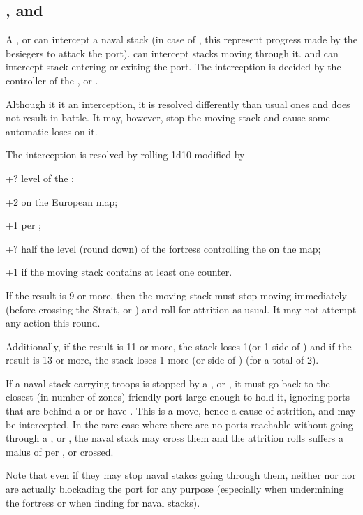 \subsection{\Presidios, \StraitFort and \USURE}
A \Presidio, \StraitFort or \USURE can intercept a naval stack (in case of
\USURE, this represent progress made by the besiegers to attack the
port). \StraitFort can intercept stacks moving through it. \Presidios and
\USURE can intercept stack entering or exiting the port. The interception is
decided by the controller of the \Presidio, \StraitFort or \USURE.

Although it it an interception, it is resolved differently than usual ones and
does not result in battle. It may, however, stop the moving stack and cause
some automatic loses on it.

The interception is resolved by rolling 1d10 modified by
\begin{modlist}
\item[+?] level of the \Presidio;
\item[+2] \StraitFort on the European map;
\item[+1] per \USURE\faceplus;
\item[+?] half the level (round down) of the fortress controlling the
  \StraitFort on the \ROTW map;
\item[+1] if the moving stack contains at least one \FLEET counter.
\end{modlist}

If the result is 9 or more, then the moving stack must stop moving immediately
(before crossing the Strait, \Presidio or \USURE) and roll for attrition as
usual. It may not attempt any action this round.

Additionally, if the result is 11 or more, the stack loses 1\ND (or 1 side of
\corsaire) and if the result is 13 or more, the stack loses 1 more \ND (or
side of \corsaire) (for a total of 2).

If a naval stack carrying troops is stopped by a \Presidio, \USURE or
\StraitFort, it must go back to the closest (in number of zones) friendly port
large enough to hold it, ignoring ports that are behind a \Presidio or
\StraitFort or have \USURE. This is a move, hence a cause of attrition, and
may be intercepted. In the rare case where there are no ports reachable
without going through a \Presidio, \StraitFort or \USURE, the naval stack may
cross them and the attrition rolls suffers a malus of  per
\Presidio, \StraitFort or \USURE crossed.

Note that even if they may stop naval stakcs going through them, neither
\StraitFort nor \Presidios nor \USURE are actually blockading the port for any
purpose (especially when undermining the fortress or when finding \SoS for
naval stacks).

